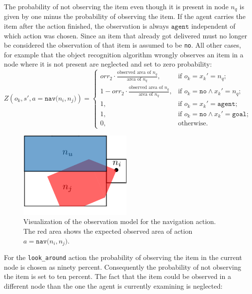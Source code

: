 The probability of not observing the item even though it is present in node $n_q$ is given by one minus the probability of observing the item. If the agent carries the item after the action finished, the observation is always $\texttt{agent}$ independent of which action was chosen. Since an item that already got delivered must no longer be considered the observation of that item is assumed to be \texttt{no}. All other cases, for example that the object recognition algorithm wrongly observes an item in a node where it is not present are neglected and set to zero probability: 
\begin{equation}\label{eq:Onav}
    Z(o_k, s', a=\texttt{nav($n_i, n_j$)}) = 
    \begin{cases}
        orr_2 \cdot \frac{\text{observed area of }n_q}{\text{area of }n_q}, & \text{if }o_k=x_k'=n_q ;\\
        1 - orr_2 \cdot \frac{\text{observed area of }n_q}{\text{area of }n_q}, & \text{if } o_k=\texttt{no}\land x_k'=n_q;\\
        1, & \text{if }o_k=x_k'=\texttt{agent};\\
        1, & \text{if }o_k=\texttt{no}\land x_k'=\texttt{goal};\\
        0, & \text{otherwise}.
    \end{cases}
\end{equation}
\begin{figure}
    \centering
    \includegraphics[width=0.5\textwidth]{Report/images/observationmodel.png}
    \caption{Visualization of the observation model for the navigation action. The red area shows the expected observed area of action $a=\texttt{nav($n_i, n_j$)}$.}
    \label{fig:obsmodel}
\end{figure}
For the \texttt{look\_around} action the probability of observing the item in the current node is chosen as ninety percent. Consequently the probability of not observing the item is set to ten percent. The fact that the item could be observed in a different node than the one the agent is currently examining is neglected:
